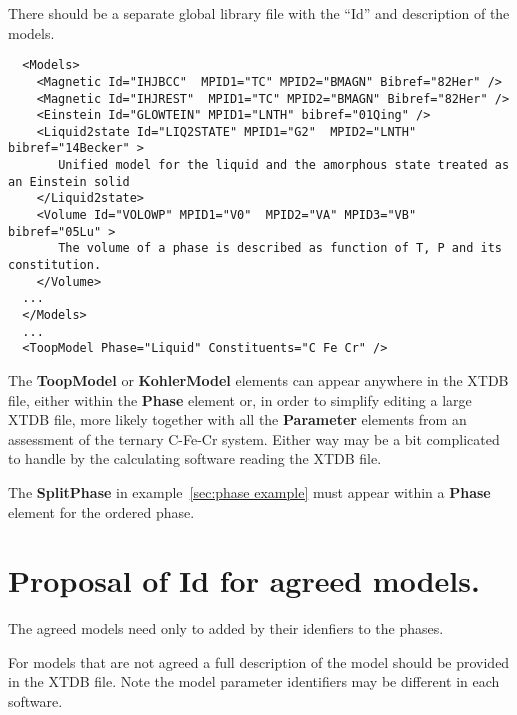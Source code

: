 \documentclass{article}
\begin{document}
\begin{appendices}
There should be a separate global library file with the ``Id'' and
description of the models.

{\small
\begin{verbatim}
  <Models>
    <Magnetic Id="IHJBCC"  MPID1="TC" MPID2="BMAGN" Bibref="82Her" />
    <Magnetic Id="IHJREST"  MPID1="TC" MPID2="BMAGN" Bibref="82Her" />
    <Einstein Id="GLOWTEIN" MPID1="LNTH" bibref="01Qing" /> 
    <Liquid2state Id="LIQ2STATE" MPID1="G2"  MPID2="LNTH" bibref="14Becker" >
       Unified model for the liquid and the amorphous state treated as an Einstein solid
    </Liquid2state>
    <Volume Id="VOLOWP" MPID1="V0"  MPID2="VA" MPID3="VB" bibref="05Lu" >
       The volume of a phase is described as function of T, P and its constitution.
    </Volume>
  ...
  </Models>
  ...
  <ToopModel Phase="Liquid" Constituents="C Fe Cr" />
\end{verbatim}
}

The {\bf ToopModel} or {\bf KohlerModel} elements can appear
anywhere in the XTDB file, either within the {\bf Phase} element or,
in order to simplify editing a large XTDB file, more likely together
with all the {\bf Parameter} elements from an assessment of the
ternary C-Fe-Cr system.  Either way may be a bit complicated to handle
by the calculating software reading the XTDB file.

The {\bf SplitPhase} in example~\ref{sec:phase example} must appear
within a {\bf Phase} element for the ordered phase.

\newpage
\section{Proposal of Id for agreed models.}\label{sec:modelapp}

The agreed models need only to added by their idenfiers to the phases.

For models that are not agreed a full description of the model should
be provided in the XTDB file.  Note the model parameter identifiers
may be different in each software.


\end{appendices}
\end{document}
